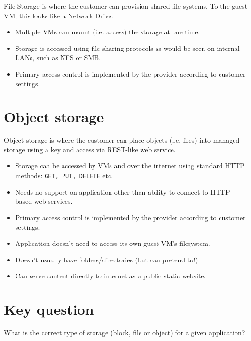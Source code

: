 \documentclass{pgnotes}
\begin{document}
File Storage is where the customer can provision shared file systems.
To the guest VM, this looks like a Network Drive.
\begin{itemize}
\item Multiple VMs can mount (i.e. access) the storage at one time.
\item Storage is accessed using file-sharing protocols as would be seen on internal LANs, such as NFS or SMB.
\item Primary access control is implemented by the provider according to customer settings.
\end{itemize}

\section{Object storage}

Object storage is where the customer can place objects (i.e. files) into managed storage using a key and access via REST-like web service.
\begin{itemize}
\item Storage can be accessed by VMs and over the internet using standard HTTP methods: \texttt{GET, PUT, DELETE} etc.
\item Needs no support on application other than ability to connect to HTTP-based web services.
\item Primary access control is implemented by the provider according to customer settings.
\item Application doesn't need to access its own guest VM's filesystem.
\item Doesn't usually have folders/directories (but can pretend to!)
\item Can serve content directly to internet as a public static website.
\end{itemize}

\section{Key question}

What is the correct type of storage (block, file or object) for a given application?
\end{document}
